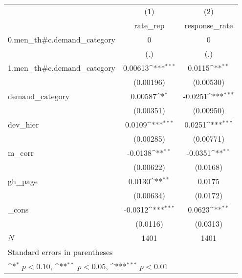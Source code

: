 {
\def\sym#1{\ifmmode^{#1}\else\(^{#1}\)\fi}
\begin{tabular}{l*{2}{c}}
\hline\hline
            &\multicolumn{1}{c}{(1)}&\multicolumn{1}{c}{(2)}\\
            &\multicolumn{1}{c}{rate\_rep}&\multicolumn{1}{c}{response\_rate}\\
\hline
0.men\_th#c.demand\_category&           0         &           0         \\
            &         (.)         &         (.)         \\
[1em]
1.men\_th#c.demand\_category&     0.00613\sym{***}&      0.0115\sym{**} \\
            &   (0.00196)         &   (0.00530)         \\
[1em]
demand\_category&     0.00587\sym{*}  &     -0.0251\sym{***}\\
            &   (0.00351)         &   (0.00950)         \\
[1em]
dev\_hier    &      0.0109\sym{***}&      0.0251\sym{***}\\
            &   (0.00285)         &   (0.00771)         \\
[1em]
m\_corr      &     -0.0138\sym{**} &     -0.0351\sym{**} \\
            &   (0.00622)         &    (0.0168)         \\
[1em]
gh\_page     &      0.0130\sym{**} &      0.0175         \\
            &   (0.00634)         &    (0.0172)         \\
[1em]
\_cons      &     -0.0312\sym{***}&      0.0623\sym{**} \\
            &    (0.0116)         &    (0.0313)         \\
\hline
\(N\)       &        1401         &        1401         \\
\hline\hline
\multicolumn{3}{l}{\footnotesize Standard errors in parentheses}\\
\multicolumn{3}{l}{\footnotesize \sym{*} \(p<0.10\), \sym{**} \(p<0.05\), \sym{***} \(p<0.01\)}\\
\end{tabular}
}
